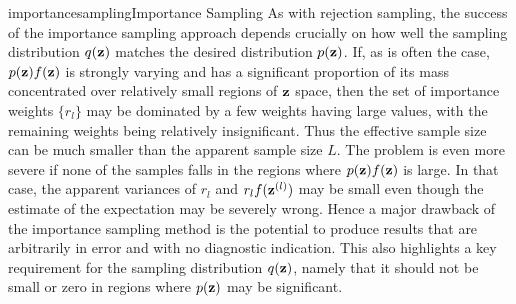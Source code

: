 \documentclass[9pt]{article}
\begin{document}
\begin{topic}{importancesampling}{Importance Sampling}
As with rejection sampling, the success of the importance sampling approach depends crucially on how well the sampling distribution $q(\mathbf{z})$ matches the desired distribution $p(\mathbf{z})$. If, as is often the case, $p(\mathbf{z})f(\mathbf{z})$ is strongly varying and has a significant proportion of its mass concentrated over relatively small regions of $\mathbf{z}$ space, then the set of importance weights $\{r_l\}$ may be dominated by a few weights having large values, with the remaining weights being relatively insignificant. Thus the effective sample size can be much smaller than the apparent sample size $L$. The problem is even more severe if none of the samples falls in the regions where $p(\mathbf{z})f(\mathbf{z})$ is large. In that case, the apparent variances of $r_l$ and $r_l f(\mathbf{z}^{(l)})$ may be small even though the estimate of the expectation may be severely wrong. Hence a major drawback of the importance sampling method is the potential to produce results that are arbitrarily in error and with no diagnostic indication. This also highlights a key requirement for the sampling distribution $q(\mathbf{z})$, namely that it should not be small or zero in regions where $p(\mathbf{z})$ may be significant.
\end{topic}
\end{document}
